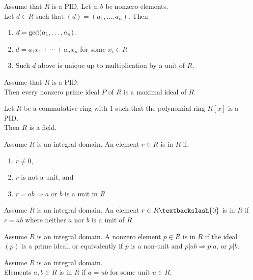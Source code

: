 \begin{proposition}
Assume that $R$ is a PID. Let $a, b$ be nonzero elements.\\
Let $d \in R$ such that $(d) = (a_1, \ldots, a_n)$. Then
\begin{enumerate}[label=(\roman*)]
\item $d=\textnormal{gcd}(a_1, \ldots, a_n)$.
\item $d=a_1 x_1 + \cdots + a_n x_n$ for some $x_i \in R$
\item Such $d$ above is unique up to multiplication by a unit of $R$.
\end{enumerate}
\end{proposition}

\begin{proposition}
Assume that $R$ is a PID.\\
Then every nonzero prime ideal $P$ of $R$ is a maximal ideal of $R$.	
\end{proposition}

\begin{corollary}
Let $R$ be a commutative ring with $1$ such that the polynomial ring $R[x]$ is a PID.\\
Then $R$ is a field.
\end{corollary}

\begin{definition}
Assume $R$ is an integral domain. An element $r \in R$ is  in $R$ if:
\begin{enumerate}[label=(\roman*)]
\item $r \neq 0$,
\item $r$ is not a unit, and
\item $r = ab \Rightarrow a$ or $b$ is a unit in $R$	
\end{enumerate}
\end{definition}

\begin{definition}
Assume $R$ is an integral domain. An element $r \in R \textbackslash \{0\}$ is  in $R$ if $r=ab$ where neither $a$ nor $b$ is a unit of $R$.
\end{definition}

\begin{definition}
Assume $R$ is an integral domain. A nonzero element $p \in R$ is  in $R$ if the ideal $(p)$ is a prime ideal, or equivalently if $p$ is a non-unit and $p|ab \Rightarrow p|a$, or $p|b$.
\end{definition}

\begin{definition}
Assume $R$ is an integral domain.\\
Elements $a, b \in R$ is  in $R$ if $a=ub$ for some unit $u \in R$.
\end{definition}

